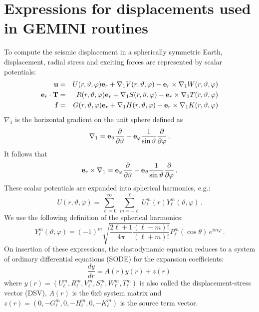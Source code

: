 \documentclass[12pt,a4paper]{article}
\renewcommand{\v}[1]{{\bf #1}}
\newcommand{\dt}{\frac{\partial}{\partial\vartheta}}
\newcommand{\dphi}{\frac{\partial}{\partial\varphi}}
\begin{document}
\setlength{\parindent}{0cm}
\addtolength{\parskip}{0.1cm}
\section{Expressions for displacements used in GEMINI routines}
%
To compute the seismic displacement in a spherically symmetric Earth, displacement, radial stress and exciting forces are represented by scalar potentials:
\begin{eqnarray}
\v{u} & = & U(r,\vartheta,\varphi)\v{e}_r+\nabla_1 V(r,\vartheta,\varphi)-\v{e}_r\times\nabla_1 W(r,\vartheta,\varphi) \nonumber \\
\v{e}_r\cdot\v{T} & = & R(r,\vartheta,\varphi)\v{e}_r+\nabla_1 S(r,\vartheta,\varphi)-\v{e}_r\times\nabla_1 T(r,\vartheta,\varphi) \nonumber \\
\v{f} & = & G(r,\vartheta,\varphi)\v{e}_r+\nabla_1 H(r,\vartheta,\varphi)-\v{e}_r\times\nabla_1 K(r,\vartheta,\varphi) \nonumber \\
\end{eqnarray}
%
$\nabla_1$ is the horizontal gradient on the unit sphere defined as
\begin{displaymath}
\nabla_1 = \v{e}_\vartheta\dt + \v{e}_\varphi\frac{1}{\sin\vartheta}\dphi \,.
\end{displaymath}
%
It follows that
%
\begin{displaymath}
\v{e}_r\times\nabla_1 = \v{e}_\varphi\dt - \v{e}_\vartheta\frac{1}{\sin\vartheta}\dphi \,.
\end{displaymath}
%
These scalar potentials are expanded into spherical harmonics, e.g.:
%
\begin{displaymath}
U(r,\vartheta,\varphi) = \sum_{\ell=0}^\infty\,\sum_{m=-\ell}^\ell\,U_\ell^m(r) Y_\ell^m(\vartheta,\varphi) \,.
\end{displaymath}
%
We use the following definition of the spherical harmonics:
\begin{displaymath}
Y_\ell^m(\vartheta,\varphi)=(-1)^m\sqrt{\frac{2\ell+1}{4\pi}\frac{(\ell-m)!}{(\ell+m)!}}P_\ell^m(\cos\theta)\,e^{im\varphi} \,.
\end{displaymath}
%
On insertion of these expressions, the elastodynamic equation reduces to a system of ordinary differential equations (SODE) for the expansion coefficients:
%
\begin{displaymath}
\frac{dy}{dr}=A(r)y(r)+z(r) \,
\end{displaymath}
%
where $y(r) = (U_\ell^m,R_\ell^m,V_\ell^m,S_\ell^m,W_\ell^m,T_\ell^m)$ is also called the displacement-stress vector (DSV), $A(r)$ is the 6x6 system matrix and $z(r) = (0,-G_\ell^m,0,-H_\ell^m,0,-K_\ell^m)$ is the source term vector.
%
\end{document}
